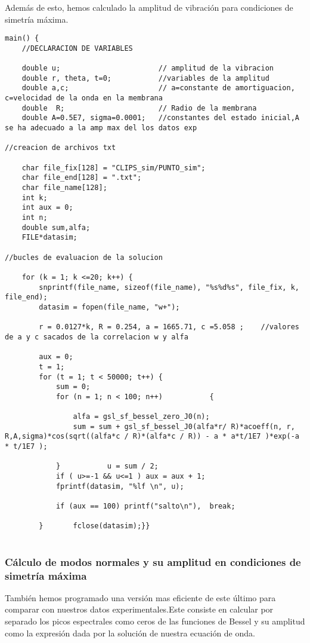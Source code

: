 \documentclass[journal, a4paper,onecolumn]{IEEEtran}
\begin{document}
Además de esto, hemos calculado la amplitud de vibración para condiciones de simetría máxima.

\begin{lstlisting}
main() {
	//DECLARACION DE VARIABLES 

	double u;						// amplitud de la vibracion
	double r, theta, t=0;			//variables de la amplitud
	double a,c;						// a=constante de amortiguacion, c=velocidad de la onda en la membrana
	double  R;						// Radio de la membrana
	double A=0.5E7, sigma=0.0001;	//constantes del estado inicial,A se ha adecuado a la amp max del los datos exp
	
//creacion de archivos txt

	char file_fix[128] = "CLIPS_sim/PUNTO_sim";		
	char file_end[128] = ".txt";
	char file_name[128];
	int k;
	int aux = 0;
	int n;
	double sum,alfa;
	FILE*datasim;
	
//bucles de evaluacion de la solucion

	for (k = 1; k <=20; k++) {
		snprintf(file_name, sizeof(file_name), "%s%d%s", file_fix, k, file_end);
		datasim = fopen(file_name, "w+");
		
		r = 0.0127*k, R = 0.254, a = 1665.71, c =5.058 ;	//valores de a y c sacados de la correlacion w y alfa
		
		aux = 0;
		t = 1;
		for (t = 1; t < 50000; t++) {
			sum = 0;
			for (n = 1; n < 100; n++)			{
				
				alfa = gsl_sf_bessel_zero_J0(n);
				sum = sum + gsl_sf_bessel_J0(alfa*r/ R)*acoeff(n, r, R,A,sigma)*cos(sqrt((alfa*c / R)*(alfa*c / R)) - a * a*t/1E7 )*exp(-a * t/1E7 );
				
			}			u = sum / 2;
			if ( u>=-1 && u<=1 ) aux = aux + 1;
			fprintf(datasim, "%lf \n", u);
		
			if (aux == 100) printf("salto\n"),	break;
			
		}		fclose(datasim);}}
		
\end{lstlisting}

\subsubsection{Cálculo de modos normales y su amplitud en condiciones de simetría máxima}

También hemos programado una versión mas eficiente de este último para comparar con nuestros datos experimentales.Este consiste en calcular por separado los picos espectrales como ceros de las funciones de Bessel y su amplitud como la expresión dada por la solución de nuestra ecuación de onda. 
\end{document}
